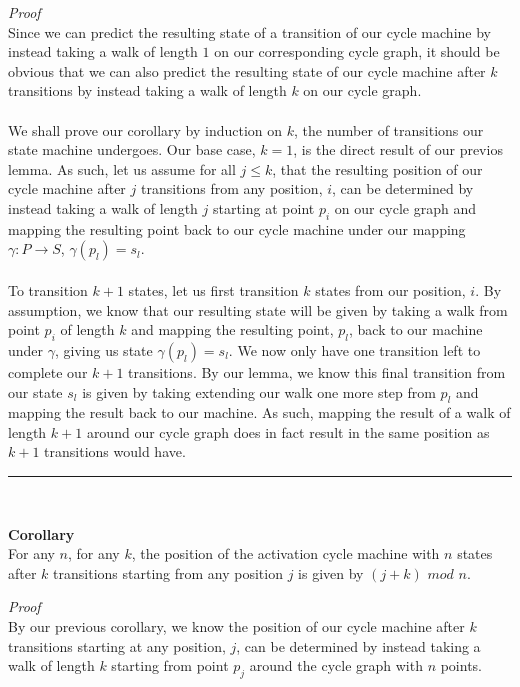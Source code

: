 \documentclass[a4paper,12pt]{article}
\begin{document}
\noindent
\textit{Proof}\\
Since we can predict the resulting state of a transition of our cycle machine by instead taking a walk of length $1$ on our corresponding cycle graph, it should be obvious that we can also predict the resulting state of our cycle machine after $k$ transitions by instead taking a walk of length $k$ on our cycle graph.\\
\\
We shall prove our corollary by induction on $k$, the number of transitions our state machine undergoes. Our base case, $k = 1$, is the direct result of our previos lemma. As such, let us assume for all $j \leq k$, that the resulting position of our cycle machine after $j$ transitions from any position, $i$, can be determined by instead taking a walk of length $j$ starting at point $p_i$ on our cycle graph and mapping the resulting point back to our cycle machine under our mapping $\gamma: P \rightarrow S$, $\gamma(p_l) = s_l$.\\
\\
To transition $k + 1$ states, let us first transition $k$ states from our position, $i$. By assumption, we know that our resulting state will be given by taking a walk from point $p_i$ of length $k$ and mapping the resulting point, $p_l$, back to our machine under $\gamma$, giving us state $\gamma(p_l) = s_l$. We now only have one transition left to complete our $k + 1$ transitions. By our lemma, we know this final transition from our state $s_l$ is given by taking extending our walk one more step from $p_l$ and mapping the result back to our machine. As such, mapping the result of a walk of length $k + 1$ around our cycle graph does in fact result in the same position as $k + 1$ transitions would have.
\begin{center}
\noindent\rule{8cm}{0.4pt}
\end{center}
\noindent
\\
\begin{tcolorbox}
\textbf{Corollary}\\
For any $n$, for any $k$, the position of the activation cycle machine with $n$ states after $k$ transitions starting from any position $j$ is given by $(j + k)$ $mod$ $n$.
\end{tcolorbox}
\noindent
\textit{Proof}\\
By our previous corollary, we know the position of our cycle machine after $k$ transitions starting at any position, $j$, can be determined by instead taking a walk of length $k$ starting from point $p_j$ around the cycle graph with $n$ points.\\
\end{document}
